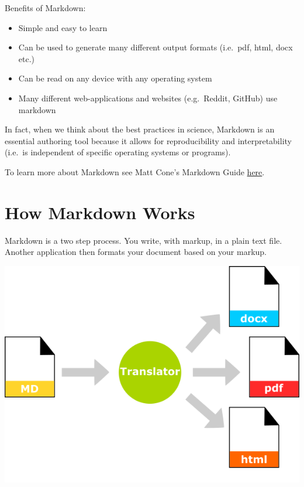 \documentclass[
]{book}
\providecommand{\tightlist}{%
  \setlength{\itemsep}{0pt}\setlength{\parskip}{0pt}}
\begin{document}
Benefits of Markdown:

\begin{itemize}
\tightlist
\item
  Simple and easy to learn
\item
  Can be used to generate many different output formats (i.e.~pdf, html, docx etc.)
\item
  Can be read on any device with any operating system
\item
  Many different web-applications and websites (e.g.~Reddit, GitHub) use markdown
\end{itemize}

In fact, when we think about the best practices in science, Markdown is an essential authoring tool because it allows for reproducibility and interpretability (i.e.~is independent of specific operating systems or programs).

To learn more about Markdown see Matt Cone's Markdown Guide \href{https://www.markdownguide.org/getting-started\#:~:text=Why\%20Use\%20Markdown\%3F\%201\%20Markdown\%20can\%20be\%20used,future\%20proof.\%20...\%205\%20Markdown\%20is\%20everywhere.\%20}{here}.

\hypertarget{how-markdown-works}{%
\section{How Markdown Works}\label{how-markdown-works}}

Markdown is a two step process. You write, with markup, in a plain text file. Another application then formats your document based on your markup.

\includegraphics{images/MD_translation.png}
\end{document}
